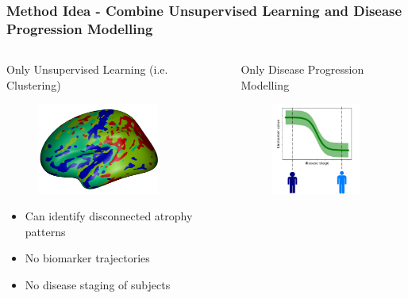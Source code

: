 \documentclass[8pt,xcolor=table]{beamer}
\begin{document}
\begin{frame}
\frametitle{Method Idea - Combine Unsupervised Learning and Disease Progression Modelling}

\vspace{-1em}

\begin{columns}[T]
  \begin{column}{.47\textwidth}
  
  \begin{center}
   
  Only Unsupervised Learning (i.e. Clustering)
  
  
  \begin{figure}
  \centering
  \includegraphics[height=3cm]{clust24_drcThFWHM0Initk-meansCl4Pr0Ra1Mrf5_VDPM_MRFPCA.png}
  \end{figure}
  \vspace{-1.5em}
 
  \begin{itemize}
   \item Can identify disconnected atrophy patterns \yes
   \item No biomarker trajectories \no
   \item No disease staging of subjects  \no
  \end{itemize}

 

  
  \end{center}  
  \end{column}
  \hspace{-2em}
  \vrule{}
  \begin{column}{.47\textwidth}
  \begin{center}
    
  Only Disease Progression Modelling
  
  
  \begin{figure}
    \centering
    \includegraphics[height=3cm,trim=120 0 120 0]{Disease_progression_one_sigmoid_confidence.png}
  \end{figure}
  \vspace{-1.5em}


\end{center}
\end{column}
\end{columns}
\end{frame}
\end{document}
